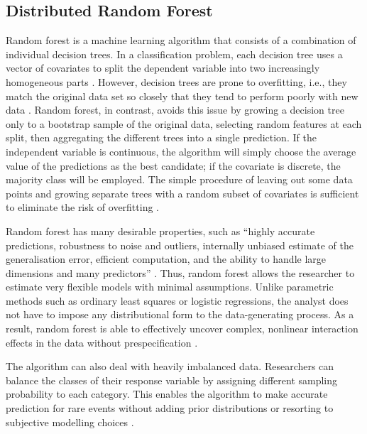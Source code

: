 \subsection{Distributed Random Forest}
\label{sub:drf}

Random forest is a machine learning algorithm that consists of a combination of individual decision trees. In a classification problem, each decision tree uses a vector of covariates to split the dependent variable into two increasingly homogeneous parts \citep{breiman2001statistical}. However, decision trees are prone to overfitting, i.e., they match the original data set so closely that they tend to perform poorly with new data \citep{dietterich1995comparison,ho1998random}. Random forest, in contrast, avoids this issue by growing a decision tree only to a bootstrap sample of the original data, selecting random features at each split, then aggregating the different trees into a single prediction. If the independent variable is continuous, the algorithm will simply choose the average value of the predictions as the best candidate; if the covariate is discrete, the majority class will be employed. The simple procedure of leaving out some data points and growing separate trees with a random subset of covariates is sufficient to eliminate the risk of overfitting \citep[9-10]{jones2015exploratory}.

Random forest has many desirable properties, such as ``highly accurate predictions, robustness to noise and outliers, internally unbiased estimate of the generalisation error, efficient computation, and the ability to handle large dimensions and many predictors'' \citep[7]{muchlinski2015comparing}. Thus, random forest allows the researcher to estimate very flexible models with minimal assumptions. Unlike parametric methods such as ordinary least squares or logistic regressions, the analyst does not have to impose any distributional form to the data-generating process. As a result, random forest is able to effectively uncover complex, nonlinear interaction effects in the data without prespecification \citep{jones2015exploratory,strobl2007bias}.

The algorithm can also deal with heavily imbalanced data. Researchers can balance the classes of their response variable by assigning different sampling probability to each category. This enables the algorithm to make accurate prediction for rare events without adding prior distributions or resorting to subjective modelling choices \citep{chen2004using,del2014use,muchlinski2015comparing}.

